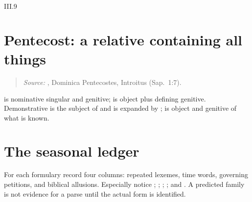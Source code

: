 \begin{courseunit}{III.9}
\section{Pentecost: a relative containing all things}

\begin{quote}

\emph{Source:} \Missal, Dominica Pentecostes, Introitus (Sap.~1:7).
\end{quote}

 is nominative singular and  genitive;
 is object plus defining genitive. Demonstrative
 is the subject of  and is expanded by
;  is object and 
genitive of what is known.

\section{The seasonal ledger}

For each formulary record four columns: repeated lexemes, time words, governing
petitions, and biblical allusions. Especially notice ; ;
; ; and
. A predicted family is not evidence
for a parse until the actual form is identified.




\end{courseunit}

